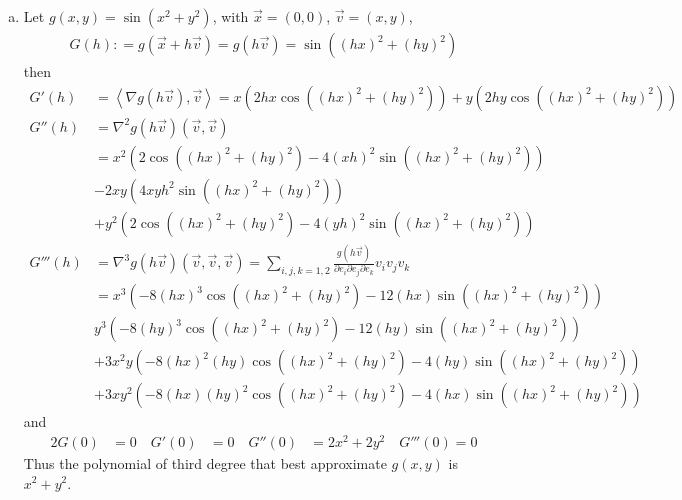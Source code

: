 \documentclass[a4paper,12pt]{article}
\theoremstyle{definition}
\begin{document}
\begin{enumerate}
\begin{enumerate}[(a)]


\item Let $g(x,y) = \sin (x^2+y^2)$, with $\vec{x} = (0,0)$, $\vec{v}=(x,y)$,
\begin{align*}
G(h): = g(\vec{x}+h\vec{v}) = g(h\vec{v}) = \sin ((hx)^2+(hy)^2)
\end{align*}
then
\begin{align*}
G'(h)&=\left\langle\nabla g(h\vec{v}),\vec{v}\right\rangle  = x (2hx\cos((hx)^2+(hy)^2)) + y (2hy\cos((hx)^2+(hy)^2))\\
G''(h)&=\nabla^2 g(h\vec{v})(\vec{v},\vec{v})\\
&=x^2(2\cos((hx)^2+(hy)^2)-4(xh)^2\sin((hx)^2+(hy)^2))\\
&-2xy(4xyh^2\sin((hx)^2+(hy)^2))\\
&+y^2(2\cos((hx)^2+(hy)^2)-4(yh)^2\sin((hx)^2+(hy)^2))\\
G'''(h)&=\nabla^3 g(h\vec{v})(\vec{v},\vec{v},\vec{v}) = \sum_{i,j,k=1,2}\frac{g(h\vec{v})}{\partial e_i\partial e_j\partial e_k}v_iv_jv_k\\
&=x^3(-8(hx)^3 \cos((hx)^2+(hy)^2) - 12 (hx) \sin((hx)^2+(hy)^2))\\
&y^3(-8(hy)^3 \cos((hx)^2+(hy)^2) - 12 (hy) \sin((hx)^2+(hy)^2))\\
&+3x^2y(-8(hx)^2(hy)\cos((hx)^2+(hy)^2)-4(hy)\sin((hx)^2+(hy)^2))\\
&+3xy^2(-8(hx)(hy)^2\cos((hx)^2+(hy)^2)-4(hx)\sin((hx)^2+(hy)^2))
\end{align*}
and 
\begin{alignat*}{2}
G(0) &= 0 \quad G'(0) &= 0 \quad  G''(0) &= 2x^2 + 2y^2 \quad G'''(0) = 0
\end{alignat*}
Thus the polynomial of third degree that best approximate $g(x,y)$ is $x^2+y^2$.	
\end{enumerate}




\end{enumerate}
\end{document}
